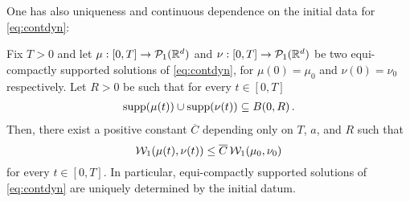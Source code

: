 One has also uniqueness and continuous dependence on the initial data for \eqref{eq:contdyn}: %

\begin{theorem}\cite{CanCarRos10}\label{uniq}
Fix $T>0$  and let $\mu:[0,T]\rightarrow\mathcal{P}_1(\mathbb{R}^d)$ and $\nu:[0,T]\rightarrow\mathcal{P}_1(\mathbb{R}^d)$ be two equi-compactly supported solutions  of \eqref{eq:contdyn}, for $\mu(0)=\mu_0$ and $\nu(0)=\nu_0$ respectively. Let $R>0$ be such that for every $t \in[0, T]$
\begin{align}\label{supptot}
\operatorname{supp}(\mu(t))\cup\operatorname{supp}(\nu(t)) \subseteq B(0, R)\,.
\end{align}
Then, there exist a positive constant $\overline{C}$ depending only on $T$, $a$,  and $R$ such that
\begin{equation}\label{stab}
\mathcal{W}_1(\mu(t), \nu(t)) \le \overline{C} \, \mathcal{W}_1(\mu_0, \nu_0)
\end{equation}
for every $t \in [0, T]$. In particular, equi-compactly supported solutions of \eqref{eq:contdyn} are uniquely determined by the initial datum.
\end{theorem}
